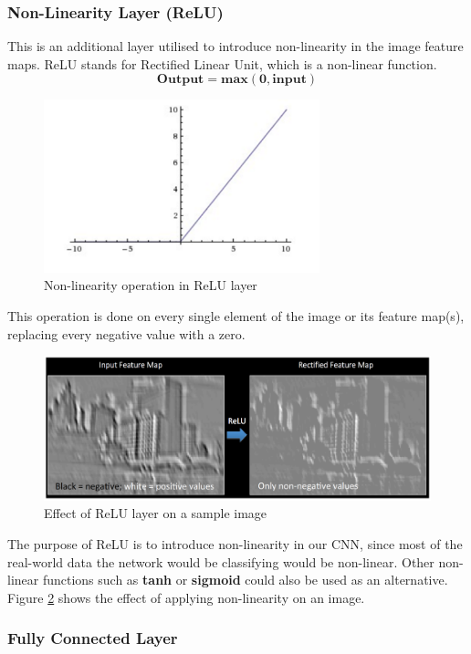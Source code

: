 \subsubsection*{Non-Linearity Layer (ReLU)}
\label{sect5_1_2_1a_c}
This is an additional layer utilised to introduce non-linearity in the image feature maps. ReLU stands for Rectified Linear Unit, which is a non-linear function.
\begin{equation}
\mathbf{Output = max(0, input)}
\end{equation}
\begin{figure}[h!]
\centering
\includegraphics[width=8cm]{figures/ReLu_Layer.png}
\caption{Non-linearity operation in ReLU layer}
\label{fig:cnn10}
\end{figure}\newline
This operation is done on every single element of the image or its feature map(s), replacing every negative value with a zero.
\begin{figure}[h!]
\centering
\includegraphics[width=12cm]{figures/Effect_ReLu.png}
\caption{Effect of ReLU layer on a sample image}
\label{fig:cnn11}
\end{figure}
The purpose of ReLU is to introduce non-linearity in our CNN, since most of the real-world data the network would be classifying would be non-linear. Other non-linear functions such as \textbf{tanh} or \textbf{sigmoid} could also be used as an alternative. Figure \ref{fig:cnn11} shows the effect of applying non-linearity on an image.

\subsubsection*{Fully Connected Layer}
\label{sect5_1_2_1a_d}

